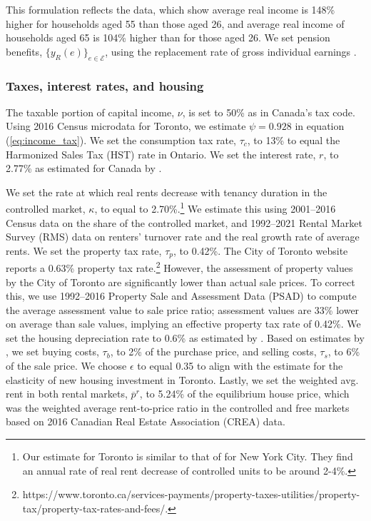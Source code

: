 \documentclass[parskip=full]{article}
\begin{document}
\noindent This formulation reflects the data, which show average real income is 148\% higher for households aged 55 than those aged 26, and average real income of households aged 65 is 104\% higher than for those aged 26. We set pension benefits, $\{y_{R}(e)\}_{e\in \mathcal{E}}$, using the replacement rate of gross individual earnings \citep{OECD-pension}.

\subsubsection{Taxes, interest rates, and housing}

The taxable portion of capital income, $\nu$, is set to 50\% as in Canada's tax code. Using 2016 Census microdata for Toronto, we estimate $\psi=0.928$ in equation (\ref{eq:income_tax}). We set the consumption tax rate, $\tau_{c}$, to 13\% to equal the Harmonized Sales Tax (HST) rate in Ontario. We set the interest rate, $r$, to 2.77\% as estimated for Canada by \citet{bruneau-etal-2018}. 

We set the rate at which real rents decrease with tenancy duration in the controlled market, $\kappa$, to equal to 2.70\%.\footnote{Our estimate for Toronto is similar to that of \citet{fmn-2022} for New York City. They find an annual rate of real rent decrease of controlled units to be around 2-4\%.} We estimate this using 2001--2016 Census data on the share of the controlled market, and 1992--2021 Rental Market Survey (RMS) data on renters' turnover rate and the real growth rate of average rents. We set the property tax rate, $\tau_p$, to 0.42\%. The City of Toronto website reports a 0.63\% property tax rate.\footnote{https://www.toronto.ca/services-payments/property-taxes-utilities/property-tax/property-tax-rates-and-fees/.} However, the assessment of property values by the City of Toronto are significantly lower than actual sale prices. To correct this, we use 1992--2016 Property Sale and Assessment Data (PSAD) to compute the average assessment value to sale price ratio; assessment values are 33\% lower on average than sale values, implying an effective property tax rate of 0.42\%. We set the housing depreciation rate to 0.6\% as estimated by \citet{rosenthal-2014}. Based on estimates by \citet{gm-2003}, we set buying costs, $\tau_{b}$, to 2\% of the purchase price, and selling costs, $\tau_{s}$, to 6\% of the sale price. We choose $\epsilon$ to equal 0.35 to align with the \citet{cmhc-report-2018} estimate for the elasticity of new housing investment in Toronto. Lastly, we set the weighted avg. rent in both rental markets, $\overline{p}^{r}$, to 5.24\% of the equilibrium house price, which was the weighted average rent-to-price ratio in the controlled and free markets based on 2016 Canadian Real Estate Association (CREA) data.
\end{document}
